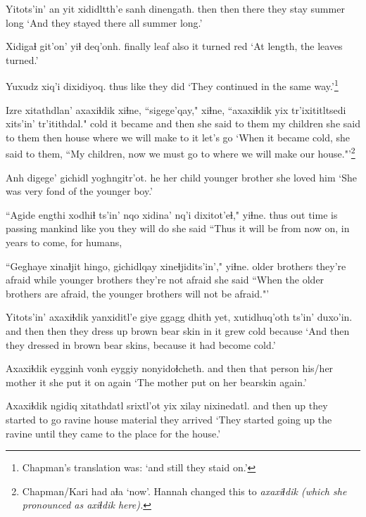 \documentclass[12pt]{article}
\begin{document}
\gll Yitots'in' an yit xididltth'e sanh  dinengath.
then  then there {they stay} summer long
\glt `And they stayed there all summer long.'
\glend 

\gll Xidigaɬ git'on' yiɬ deq'onh.
finally leaf  also {it turned red}
\glt `At length, the leaves turned.'
\glend 

\gll Yuxudz xiq'i dixidiyoq.
thus  like {they did}
\glt  `They continued in the same way.'\footnote{Chapman's translation was: `and still they staid on.'}
\glend 

\gll Izre xitathdlan' axaxiɬdik xiɬne,   ``sigege'qay," xiɬne, ``axaxiɬdik yix tr'ixititltsedi xits'in' tr'itithdal."
cold {it became} {and then} {she said to them} {my children}  {she said to them} then house {where we will make} {to it} {let's go}
\glt `When it became cold, she said to them, ``My children, now we must go to where we will make our house."'\footnote{Chapman/Kari had aɬa `now'. Hannah changed this to \em axaxiɬdik \em (which she pronounced as \em axiɬdik \em here).}
\glend 

\gll Anh digege' gichidl  yoghngitr'ot.
he {her child} {younger brother} {she loved him}
\glt `She was very fond of the younger boy.'
\glend 

\gll ``Agide engthi xodhiɬ ts'in' {nqo xidina'} nq'i  dixitot'eɬ," yiɬne.
thus  out {time is passing} {} mankind   {like you} {they will do} {she said}
\glt  ``Thus it will be from now on, in years to come, for humans,
\glend 

\gll ``Geghaye  xinaɬjit hingo,  gichidlqay  {xineɬjidits'in',"} yiɬne.
{older brothers} {they're afraid} while  {younger brothers} {they're not afraid}  {she said}
\glt ``When the older brothers are afraid, the younger brothers will not be afraid."'
\glend 

\gll Yitots'in' axaxiɬdik yanxiditl'e   {giye ggagg} dhith yet, xutidhuq'oth ts'in' duxo'in.
{and then} then  {they dress up} {brown bear} skin in {it grew cold} {} because
\glt `And then they dressed in brown bear skins, because it had become cold.'
\glend 

\gll Axaxiɬdik eygginh vonh  eyggiy nonyidoɬcheth.
{and then} {that person} {his/her mother} it {she put it on again}
\glt `The mother put on her bearskin again.'
\glend 

\gll Axaxiɬdik ngidiq xitathdatl  srixtl'ot yix xilay nixinedatl.
{and then}  up  {they started to go} ravine  house material {they arrived}
\glt `They started going up the ravine until they came to the place for the house.'
\glend 
\end{document}
